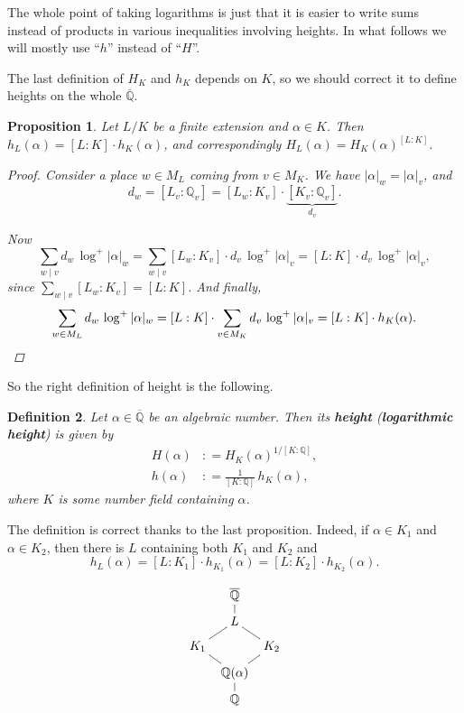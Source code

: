 \documentclass{article}
\newcommand{\term}{\textbf}
\newcommand{\dfn}{\mathrel{\mathop:}=}
\newcommand{\QQ}{\mathbb{Q}}
\theoremstyle{myplain}
\newtheorem{proposition}{Proposition}[section]
\theoremstyle{mydefinition}
\newtheorem{definition}[proposition]{Definition}
\begin{document}
The whole point of taking logarithms is just that it is easier to write sums
instead of products in various inequalities involving heights. In what follows
we will mostly use ``$h$'' instead of ``$H$''.

The last definition of $H_K$ and $h_K$ depends on $K$, so we should correct it
to define heights on the whole $\overline{\QQ}$.

\begin{proposition}
  Let $L/K$ be a finite extension and $\alpha\in K$. Then
  $h_L (\alpha) = [L:K] \cdot h_K (\alpha)$, and correspondingly
  $H_L (\alpha) = H_K (\alpha)^{[L:K]}$.

  \begin{proof}
    Consider a place $w \in M_L$ coming from $v \in M_K$. We have
    $|\alpha|_w = |\alpha|_v$, and
    $$d_w = [L_v : \QQ_v] = [L_w : K_v] \cdot \underbrace{[K_v : \QQ_v]}_{d_v}.$$

    Now
    \[ \sum_{w \mid v} d_w \, \log^+ |\alpha|_w =
      \sum_{w \mid v} [L_w : K_v] \cdot d_v \, \log^+ |\alpha|_v =
      [L : K] \cdot d_v \, \log^+ |\alpha|_v, \]
    since $\sum_{w \mid v} [L_w : K_v] = [L : K]$. And finally,
    \[ \sum_{w \in M_L} d_w \, \log^+ |\alpha|_w =
      [L : K] \cdot \sum_{v \in M_K} d_v \, \log^+ |\alpha|_v =
      [L : K] \cdot h_K (\alpha). \qedhere \]
  \end{proof}
\end{proposition}

So the right definition of height is the following.

\begin{definition}
  Let $\alpha \in \overline{\QQ}$ be an algebraic number. Then its \term{height}
  (\term{logarithmic height}) is given by
  \begin{align*}
    H (\alpha) & \dfn H_K (\alpha)^{1/[K:\QQ]},\\
    h (\alpha) & \dfn \frac{1}{[K : \QQ]} \, h_K (\alpha),
  \end{align*}
  where $K$ is some number field containing $\alpha$.
\end{definition}

The definition is correct thanks to the last proposition. Indeed, if
$\alpha \in K_1$ and $\alpha \in K_2$, then there is $L$ containing both $K_1$
and $K_2$ and
\[ h_L (\alpha) = [L : K_1] \cdot h_{K_1} (\alpha) = [L : K_2] \cdot h_{K_2} (\alpha). \]

\[ \xymatrix@R=0.6em@C=0.6em{
    & \overline{\QQ}\ar@{-}[d] \\
    & L\ar@{-}[dr]\ar@{-}[dl] \\
    K_1\ar@{-}[dr] & & K_2\ar@{-}[dl] \\
    & \QQ (\alpha)\ar@{-}[d] \\
    & \QQ
  } \]
\end{document}
